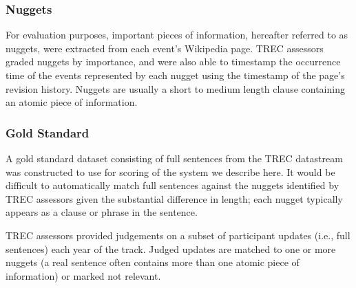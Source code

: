 \subsubsection{Nuggets}
For evaluation purposes, important pieces of information, hereafter 
referred to as nuggets, were extracted from each event's Wikipedia page.
TREC assessors graded nuggets by importance, and were also able to timestamp
the occurrence time of the events represented by each nugget
using the timestamp of the page's revision history. Nuggets are 
usually a short to medium length clause containing an atomic piece of
information.

\subsubsection{Gold Standard} %

A gold standard dataset consisting of full sentences from the TREC datastream
was constructed to use for scoring of the system we describe here. It would be
difficult to automatically match full sentences against the nuggets identified
by TREC assessors given the substantial difference in length; each nugget
typically appears as a clause or phrase in the sentence.

TREC assessors provided judgements on a subset of participant updates (i.e.,
full sentences)  each year
of the track. Judged updates are matched to one or more nuggets (a real 
sentence often contains more than one atomic piece of information) or marked
not relevant.

